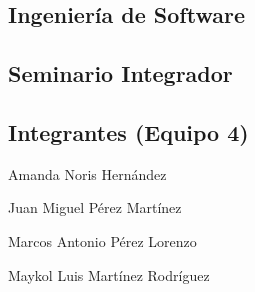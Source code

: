 \documentclass{report}
\begin{document}
  \vspace*{\fill}
  \begin{center}
    \section*{Ingenier\'ia de Software}
    \subsection*{Seminario Integrador}
    \subsection*{Integrantes (Equipo 4)}

    Amanda Noris Hern\'andez
    
    Juan Miguel P\'erez Mart\'inez

    Marcos Antonio P\'erez Lorenzo
    
    Maykol Luis Martínez Rodr\'iguez
  \end{center}

  \vspace*{\fill}
  
  
\end{document}
